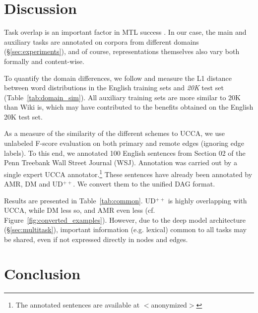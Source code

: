 \documentclass[11pt,a4paper]{article}
\begin{document}
\section{Discussion}\label{sec:discussion}

Task overlap is an important factor in MTL success
\cite{E17-2026,E17-1005}.
In our case, the main and auxiliary tasks are annotated on corpora
from different domains (\S\ref{sec:experiments}), and
of course, representations themselves also vary both formally and content-wise.

To quantify the domain differences, we follow \citet{Plank2011EffectiveMO} and measure the L1 distance 
between word distributions in the English training sets and \textit{20K} test set
(Table~\ref{tab:domain_sim}).
All auxiliary training sets are more similar to 20K than Wiki is, which may have
contributed to the benefits obtained on the English 20K test set.

As a measure of the similarity of the different schemes to UCCA,
we use unlabeled F-score evaluation on both primary and remote edges (ignoring edge labels).
To this end, we annotated 100 English sentences from Section 02 of the Penn Treebank Wall Street Journal (WSJ).
Annotation was carried out by a single expert UCCA annotator.\footnote{The annotated sentences are 
available at $<$anonymized$>$}
These sentences have already been annotated by AMR, DM and UD$^{++}$.
We convert them to the unified DAG format.

Results are presented in Table~\ref{tab:common}.
UD$^{++}$ is highly overlapping with UCCA, while DM less so, and AMR even less
(cf. Figure~\ref{fig:converted_examples}).
However, due to the deep model architecture (\S\ref{sec:multitask}),
important information (e.g. lexical) common to all tasks may be shared,
even if not expressed directly in nodes and edges.


\section{Conclusion}\label{sec:conclusion}
\end{document}
